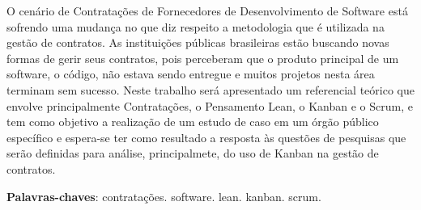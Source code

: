\begin{resumo}
 O cenário de Contratações de Fornecedores de Desenvolvimento de Software
está sofrendo uma mudança no que diz respeito a metodologia que é utilizada na gestão de contratos.
As instituições públicas brasileiras estão buscando novas formas de gerir seus contratos, pois
perceberam que o produto principal de um software, o código, não estava sendo entregue
e muitos projetos nesta área terminam sem sucesso. Neste trabalho será apresentado um referencial 
teórico que envolve principalmente Contratações, o Pensamento Lean, o Kanban e o Scrum, e tem como objetivo a realização de um estudo de caso em um órgão público específico e espera-se ter como resultado a resposta às questões de pesquisas
que serão definidas para análise, principalmete, do uso de Kanban na gestão de contratos.

 \vspace{\onelineskip}
    
 \noindent
 \textbf{Palavras-chaves}: contratações. software. lean. kanban. scrum.
\end{resumo}
